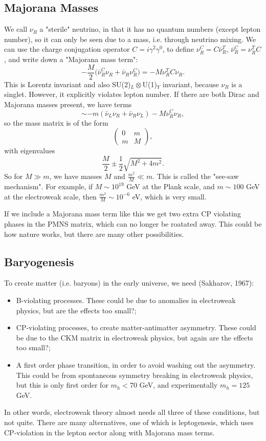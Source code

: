 \subsection{Majorana Masses}
We call $\nu_R$ a "sterile" neutrino, in that it has no quantum numbers (except lepton number), so it can only be seen due to a mass, i.e. through neutrino mixing. We can use the charge conjugation operator $C=i \gamma^2 \gamma^0$, to define $\nu_R^C = C\bar{\nu}_R^T$, $\bar{\nu}_R^C = \nu_R^T C$, and write down a "Majorana mass term":
\begin{equation}
-\frac{M}{2}\bigg( \bar{\nu}_R^C \nu_R + \bar{\nu}_R \nu_R^C \bigg) = -M \nu_R^T C \nu_R.
\end{equation}
This is Lorentz invariant and also SU(2)$_L \otimes$U(1)$_Y$ invariant, because $\nu_R$ is a singlet. However, it explicitly violates lepton number. If there are both Dirac and Majorana masses present, we have terms
\begin{equation}
\sim -m(\bar{\nu}_L\nu_R + \bar{\nu}_R \nu_L) - M \nu_R^C \nu_R,
\end{equation}
so the mass matrix is of the form
\begin{equation}
\begin{pmatrix}
0 & m \\
m & M
\end{pmatrix},
\end{equation}
with eigenvalues
\begin{equation}
\frac{M}{2} \pm \frac{1}{2} \sqrt{M^2 + 4m^2}.
\end{equation}
So for $M \gg m$, we have masses $M$ and $\frac{m^2}{M} \ll m$. This is called the "see-saw mechanism". For example, if $M \sim 10^{19}$ GeV at the Plank scale, and $m \sim 100$ GeV at the electroweak scale, then $\frac{m^2}{M} \sim 10^{-6}$ eV, which is very small.

If we include a Majorana mass term like this we get two extra CP violating phases in the PMNS matrix, which can no longer be roatated away. This could be how nature works, but there are many other possibilities. 
\subsection{Baryogenesis}
To create matter (i.e. baryons) in the early universe, we need (Sakharov, 1967):
\begin{itemize}
\item B-violating processes. These could be due to anomalies in electroweak physics, but are the effects too small?;
\item CP-violating processes, to create matter-antimatter asymmetry. These could be due to the CKM matrix in electroweak physics, but again are the effects too small?;
\item A first order phase transition, in order to avoid washing out the asymmetry. This could be from spontaneous symmetry breaking in electroweak physics, but this is only first order for $m_h < 70$ GeV, and experimentally $m_h = 125$ GeV.
\end{itemize}
In other words, electroweak theory almost needs all three of these conditions, but not quite. There are many alternatives, one of which is leptogenesis, which uses CP-violation in the lepton sector along with Majorana mass terms.